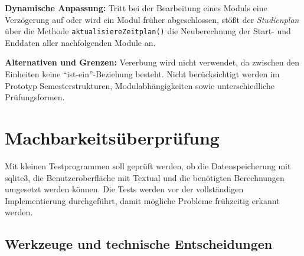 \documentclass[11pt,a4paper]{article}
\begin{document}
\textbf{Dynamische Anpassung:} Tritt bei der Bearbeitung eines Moduls eine Verzögerung auf oder wird ein Modul früher abgeschlossen, stößt der \textit{Studienplan} über die Methode \texttt{aktualisiereZeitplan()} die Neuberechnung der Start- und Enddaten aller nachfolgenden Module an.

\textbf{Alternativen und Grenzen:} Vererbung wird nicht verwendet, da zwischen den Einheiten keine \enquote{ist-ein}-Beziehung besteht. Nicht berücksichtigt werden im Prototyp Semesterstrukturen, Modulabhängigkeiten sowie unterschiedliche Prüfungsformen.

\section{Machbarkeitsüberprüfung}

Mit kleinen Testprogrammen soll geprüft werden, ob die Datenspeicherung mit
sqlite3, die Benutzeroberfläche mit Textual und die benötigten Berechnungen
umgesetzt werden können. Die Tests werden vor der vollständigen
Implementierung durchgeführt, damit mögliche Probleme frühzeitig erkannt
werden.

\subsection{Werkzeuge und technische Entscheidungen}
\end{document}
